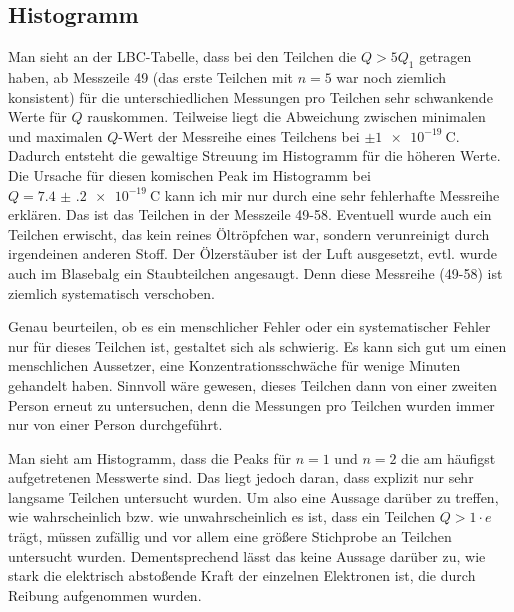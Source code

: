 \subsection{Histogramm}
Man sieht an der LBC-Tabelle, dass bei den Teilchen die \(Q>5Q_1\) getragen haben, ab Messzeile 49 (das erste Teilchen mit \(n=5\) war noch ziemlich konsistent) für die unterschiedlichen Messungen pro Teilchen sehr schwankende Werte für \(Q\) rauskommen. Teilweise liegt die Abweichung zwischen minimalen und maximalen \(Q\)-Wert der Messreihe eines Teilchens bei \(\pm\qty{1e-19}{\coulomb}\). Dadurch entsteht die gewaltige Streuung im Histogramm für die höheren Werte. \\Die Ursache für diesen komischen Peak im Histogramm bei \(Q=\qty{7.4(2)e-19}{\coulomb}\) kann ich mir nur durch eine sehr fehlerhafte Messreihe erklären. Das ist das Teilchen in der Messzeile 49-58. Eventuell wurde auch ein Teilchen erwischt, das kein reines Öltröpfchen war, sondern verunreinigt durch irgendeinen anderen Stoff. Der Ölzerstäuber ist der Luft ausgesetzt, evtl. wurde auch im Blasebalg ein Staubteilchen angesaugt. Denn diese Messreihe (49-58) ist ziemlich systematisch verschoben. 

Genau beurteilen, ob es ein menschlicher Fehler oder ein systematischer Fehler nur für dieses Teilchen ist, gestaltet sich als schwierig. Es kann sich gut um einen menschlichen Aussetzer, eine Konzentrationsschwäche für wenige Minuten gehandelt haben. Sinnvoll wäre gewesen, dieses Teilchen dann von einer zweiten Person erneut zu untersuchen, denn die Messungen pro Teilchen wurden immer nur von einer Person durchgeführt.

Man sieht am Histogramm, dass die Peaks für \(n=1\) und \(n=2\) die am häufigst aufgetretenen Messwerte sind. Das liegt jedoch daran, dass explizit nur sehr langsame Teilchen untersucht wurden. Um also eine Aussage darüber zu treffen, wie wahrscheinlich bzw. wie unwahrscheinlich es ist, dass ein Teilchen \(Q>1 \cdot e\) trägt, müssen zufällig und vor allem eine größere Stichprobe an Teilchen untersucht wurden. Dementsprechend lässt das keine Aussage darüber zu, wie stark die elektrisch abstoßende Kraft der einzelnen Elektronen ist, die durch Reibung aufgenommen wurden. 

